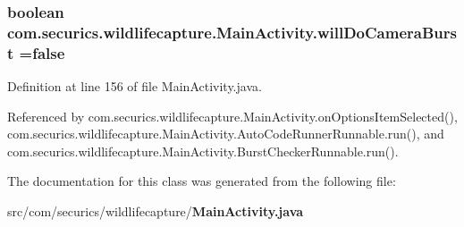 \subsubsection[{will\+Do\+Camera\+Burst}]{\setlength{\rightskip}{0pt plus 5cm}boolean com.\+securics.\+wildlifecapture.\+Main\+Activity.\+will\+Do\+Camera\+Burst =false}\label{classcom_1_1securics_1_1wildlifecapture_1_1_main_activity_a63f04d1478f7011e1b7aa1212dea111a}


Definition at line 156 of file Main\+Activity.\+java.



Referenced by com.\+securics.\+wildlifecapture.\+Main\+Activity.\+on\+Options\+Item\+Selected(), com.\+securics.\+wildlifecapture.\+Main\+Activity.\+Auto\+Code\+Runner\+Runnable.\+run(), and com.\+securics.\+wildlifecapture.\+Main\+Activity.\+Burst\+Checker\+Runnable.\+run().



The documentation for this class was generated from the following file\+:\begin{DoxyCompactItemize}
\item 
src/com/securics/wildlifecapture/{\bf Main\+Activity.\+java}\end{DoxyCompactItemize}
